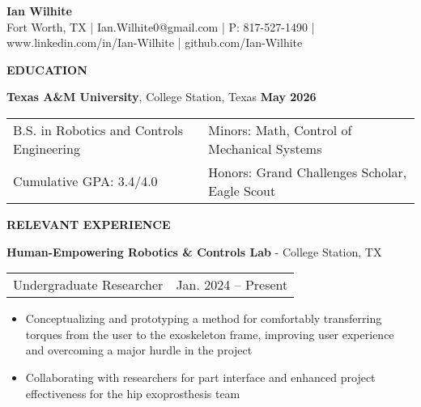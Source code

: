 \documentclass[18pt]{article}
\begin{document}

\begin{center}
    \vspace{-\baselineskip}
    \LARGE \textbf{Ian Wilhite}\\ 
    \small Fort Worth, TX | Ian.Wilhite0@gmail.com | P: 817-527-1490 | www.linkedin.com/in/Ian-Wilhite | github.com/Ian-Wilhite
\end{center}

\vspace{-0.5\baselineskip}
\begin{center}
    \textbf{EDUCATION}
    \hrulefill
\end{center}
\vspace{-0.5\baselineskip}

\textbf{Texas A\&M University}, College Station, Texas \hfill \textbf{May 2026}

\begin{tabular}{l|l} %
    B.S. in Robotics and Controls Engineering \hspace*{0.05in} & Minors: Math, Control of Mechanical Systems \\ 
    Cumulative GPA: 3.4/4.0 & Honors: Grand Challenges Scholar, Eagle Scout\\
\end{tabular}

\begin{center}
    \textbf{RELEVANT EXPERIENCE}
    \hrulefill
\end{center}
\vspace{-0.5\baselineskip}

\textbf{Human-Empowering Robotics \& Controls Lab} - College Station, TX 

\begin{tabular}{p{} p{}}
    Undergraduate Researcher & \hfill Jan. 2024 – Present
\end{tabular}

\begin{itemize}[noitemsep]
    \vspace{-0.5\baselineskip}
    \item Conceptualizing and prototyping a method for comfortably transferring torques from the user to the exoskeleton frame, improving user experience and overcoming a major hurdle in the project
    \item Collaborating with researchers for part interface and enhanced project effectiveness for the hip exoprosthesis team
\end{itemize}
\end{document}
